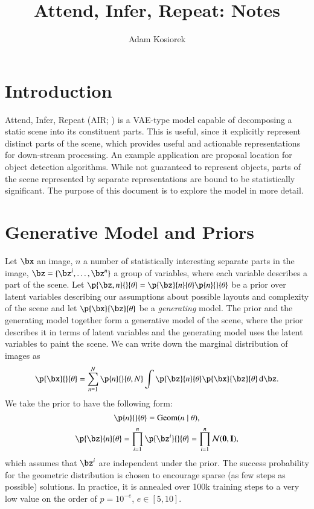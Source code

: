 \documentclass[]{article}
\title{Attend, Infer, Repeat: Notes}
\author{Adam Kosiorek}
\begin{document}
\maketitle


\section{Introduction}

    Attend, Infer, Repeat (AIR; \cite{Eslami2016}) is a VAE-type model capable of decomposing a static scene into its constituent parts. This is useful, since it explicitly represent distinct parts of the scene, which provides useful and actionable representations for down-stream processing. An example application are proposal location for object detection algorithms. While not guaranteed to represent objects, parts of the scene represented by separate representations are bound to be statistically significant. The purpose of this document is to explore the model in more detail.
    
\section{Generative Model and Priors}

    Let $\bx$ an image, $n$ a number of statistically interesting separate parts in the image, $\bz = \{\bz^i, \dots, \bz^n \}$ a group of variables, where each variable describes a part of the scene. Let $\p{\bz, n}{}{\theta} = \p{\bz}{n}{\theta}\p{n}{}{\theta}$ be a prior over latent variables describing our assumptions about possible layouts and complexity of the scene and let $\p{\bx}{\bz}{\theta}$ be a \emph{generating} model. The prior and the generating model together form a generative model of the scene, where the prior describes it in terms of latent variables and the generating model uses the latent variables to paint the scene. We can write down the marginal distribution of images as 
    \begin{equation}
        \p{\bx}{}{\theta} = \sum_{n=1}^N \p{n}{}{\theta, N} \int \p{\bz}{n}{\theta} \p{\bx}{\bz}{\theta} \dint \bz.
    \end{equation}
    We take the prior to have the following form:
    \begin{equation}
        \p{n}{}{\theta} = \mathrm{Geom} (n \mid \theta),
    \end{equation}
    \begin{equation}
        \p{\bz}{n}{\theta} = \prod_{i=1}^n \p{\bz^i}{}{\theta} = \prod_{i=1}^n \gauss{\bf{0}, \bf{I}},
    \end{equation}
    which assumes that $\bz^i$ are independent under the prior. The success probability for the geometric distribution is chosen to encourage sparse (as few steps as possible) solutions. In practice, it is annealed over 100k training steps to a very low value on the order of $p = 10^{-e}$,  $e \in [5, 10]$.
    
\end{document}
